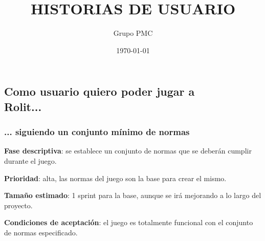 \documentclass[../../SCRUM.tex]{subfiles}
\title{HISTORIAS DE USUARIO}
\date{\today}
\author{Grupo PMC}
\begin{document}


\setcounter{secnumdepth}{3}

\subsection{Como usuario quiero poder jugar a \\ Rolit...}
\subsubsection{... siguiendo un conjunto mínimo de normas}
\textbf{Fase descriptiva}: se establece un conjunto de normas que se deberán cumplir durante el juego.

\textbf{Prioridad}: alta, las normas del juego son la base para crear el mismo.

\textbf{Tamaño estimado}: 1 sprint para la base, aunque se irá mejorando a lo largo del proyecto.

\textbf{Condiciones de aceptación}: el juego es totalmente funcional con el conjunto de normas especificado.
\end{document}
